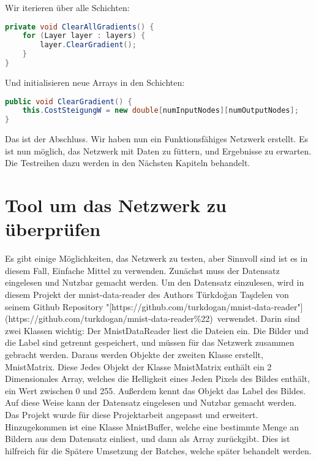 \documentclass[12pt]{article}
\begin{document}
Wir iterieren über alle Schichten:\begin{lstlisting}[language=Java]
private void ClearAllGradients() {
    for (Layer layer : layers) {
        layer.ClearGradient();
    }
}
\end{lstlisting}Und initialisieren neue Arrays in den Schichten:\begin{lstlisting}[language=Java]
public void ClearGradient() {
    this.CostSteigungW = new double[numInputNodes][numOutputNodes];
}
\end{lstlisting}Das ist der Abschluss. Wir haben nun ein Funktionsfähiges Netzwerk erstellt. Es ist nun möglich, das Netzwerk mit Daten zu füttern, und Ergebnisse zu erwarten. Die Testreihen dazu werden in den Nächsten Kapiteln behandelt.\section{ Tool um das Netzwerk zu überprüfen}Es gibt einige Möglichkeiten, das Netzwerk zu testen, aber Sinnvoll sind ist es in diesem Fall, Einfache Mittel zu verwenden.
Zunächst muss der Datensatz eingelesen und Nutzbar gemacht werden.
Um den Datensatz einzulesen, wird in diesem Projekt der mnist-data-reader des Authors Türkdoğan Taşdelen von seinem Github Repository "[https://github.com/turkdogan/mnist-data-reader"](https://github.com/turkdogan/mnist-data-reader\%22) verwendet. Darin sind zwei Klassen wichtig:  
Der MnistDataReader liest die Dateien ein. Die Bilder und die Label sind getrennt gespeichert, und müssen für das Netzwerk zusammen gebracht werden. Daraus werden Objekte der zweiten Klasse erstellt, MnistMatrix. Diese Jedes Objekt der Klasse MnistMatrix enthält ein 2 Dimensionales Array, welches die Helligkeit eines Jeden Pixels des Bildes enthält, ein Wert zwischen 0 und 255. Außerdem kennt das Objekt das Label des Bildes.  
Auf diese Weise kann der Datensatz eingelesen und Nutzbar gemacht werden.
Das Projekt wurde für diese Projektarbeit angepasst und erweitert. Hinzugekommen ist eine Klasse MnistBuffer, welche eine bestimmte Menge an Bildern aus dem Datensatz einliest, und dann als Array zurückgibt. Dies ist hilfreich für die Spätere Umsetzung der Batches, welche später behandelt werden.
\end{document}
